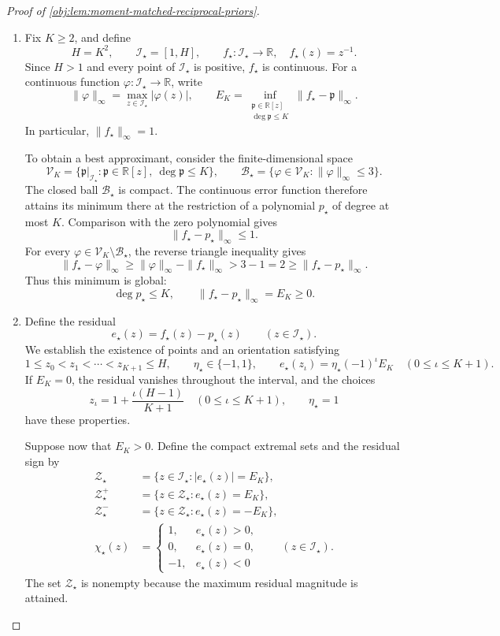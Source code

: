 \begin{proof}[Proof of \cref{obj:lem:moment-matched-reciprocal-priors}]
\begin{enumerate}
\item Fix \(K\ge2\), and define
\[
H=K^2,\qquad
\mathcal I_\star=[1,H],\qquad
f_\star:\mathcal I_\star\to\mathbb R,\quad f_\star(z)=z^{-1}.
\]
Since \(H>1\) and every point of \(\mathcal I_\star\) is positive, \(f_\star\) is continuous. For a continuous function \(\varphi:\mathcal I_\star\to\mathbb R\), write
\[
\|\varphi\|_\infty=\max_{z\in\mathcal I_\star}|\varphi(z)|,
\qquad
E_K=\inf_{\substack{\mathfrak p\in\mathbb R[z]\\ \deg\mathfrak p\le K}}
\|f_\star-\mathfrak p\|_\infty.
\]
In particular, \(\|f_\star\|_\infty=1\).

To obtain a best approximant, consider the finite-dimensional space
\[
\mathcal V_K
=\{\mathfrak p|_{\mathcal I_\star}:
  \mathfrak p\in\mathbb R[z],\ \deg\mathfrak p\le K\},
\qquad
\mathcal B_\star
=\{\varphi\in\mathcal V_K:\|\varphi\|_\infty\le3\}.
\]
The closed ball \(\mathcal B_\star\) is compact. The continuous error function therefore attains its minimum there at the restriction of a polynomial \(p_\star\) of degree at most \(K\). Comparison with the zero polynomial gives
\[
\|f_\star-p_\star\|_\infty\le1.
\]
For every \(\varphi\in\mathcal V_K\setminus\mathcal B_\star\), the reverse triangle inequality gives
\[
\|f_\star-\varphi\|_\infty
\ge\|\varphi\|_\infty-\|f_\star\|_\infty
>3-1=2
\ge\|f_\star-p_\star\|_\infty.
\]
Thus this minimum is global:
\[
\deg p_\star\le K,\qquad
\|f_\star-p_\star\|_\infty=E_K\ge0.
\]

\item Define the residual
\[
e_\star(z)=f_\star(z)-p_\star(z)
\qquad(z\in\mathcal I_\star).
\]
We establish the existence of points and an orientation satisfying
\[
1\le z_0<z_1<\cdots<z_{K+1}\le H,\qquad
\eta_\star\in\{-1,1\},\qquad
e_\star(z_\iota)=\eta_\star(-1)^\iota E_K
\quad(0\le\iota\le K+1).
\]
If \(E_K=0\), the residual vanishes throughout the interval, and the choices
\[
z_\iota=1+\frac{\iota(H-1)}{K+1}
\quad(0\le\iota\le K+1),
\qquad
\eta_\star=1
\]
have these properties.

Suppose now that \(E_K>0\). Define the compact extremal sets and the residual sign by
\[
\begin{aligned}
\mathcal Z_\star
&=\{z\in\mathcal I_\star:|e_\star(z)|=E_K\},\\
\mathcal Z_\star^+
&=\{z\in\mathcal Z_\star:e_\star(z)=E_K\},\\
\mathcal Z_\star^-
&=\{z\in\mathcal Z_\star:e_\star(z)=-E_K\},\\
\chi_\star(z)
&=
\begin{cases}
1,&e_\star(z)>0,\\
0,&e_\star(z)=0,\\
-1,&e_\star(z)<0
\end{cases}
\qquad(z\in\mathcal I_\star).
\end{aligned}
\]
The set \(\mathcal Z_\star\) is nonempty because the maximum residual magnitude is attained.


\end{enumerate}
\end{proof}
